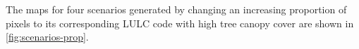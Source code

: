 \documentclass[10pt,letterpaper]{article}
\begin{document}
The maps for four scenarios generated by changing an increasing proportion of pixels to its corresponding LULC code with high tree canopy cover are shown in \autoref{fig:scenarios-prop}.
\end{document}
